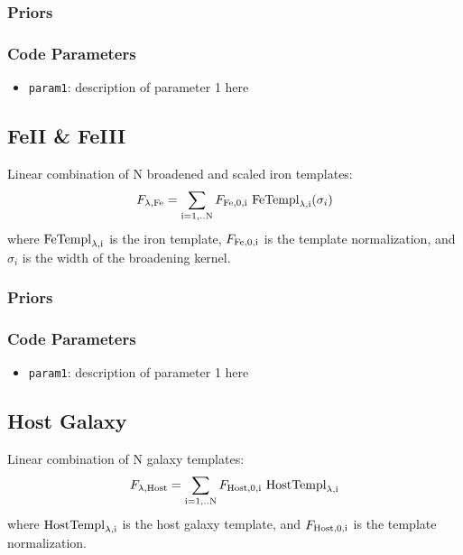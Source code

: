 \documentclass[12pt,letterpaper]{article}
\begin{document}
\subsubsection*{Priors}

\subsubsection*{Code Parameters}

\begin{itemize}
    \item {\tt param1}: description of parameter 1 here
\end{itemize}

\subsection*{FeII \& FeIII}
Linear combination of N broadened and scaled iron templates:
\begin{equation}
F_{\lambda {\rm{,Fe}}} = \sum_{\rm i=1,..N} F_{\rm{Fe,0,i}} \  {\rm FeTempl}_{\rm{\lambda,i}}(\sigma_i) 
\end{equation}
where ${\rm FeTempl}_{\rm{\lambda,i}}$ is the iron template, $F_{\rm Fe,0,i}$ is the template normalization, and $\sigma_i$ is the 
width of the broadening kernel.
\subsubsection*{Priors}

\subsubsection*{Code Parameters}

\begin{itemize}
    \item {\tt param1}: description of parameter 1 here
\end{itemize}

\subsection*{Host Galaxy}
Linear combination of N galaxy templates:
\begin{equation}
F_{\lambda {\rm{,Host}}} = \sum_{\rm i=1,..N} F_{\rm{Host,0,i}} \  {\rm HostTempl}_{\rm{\lambda,i}} 
\end{equation}
where ${\rm HostTempl}_{\rm{\lambda,i}}$ is the host galaxy template, and $F_{\rm Host,0,i}$ is the template normalization.
\end{document}
